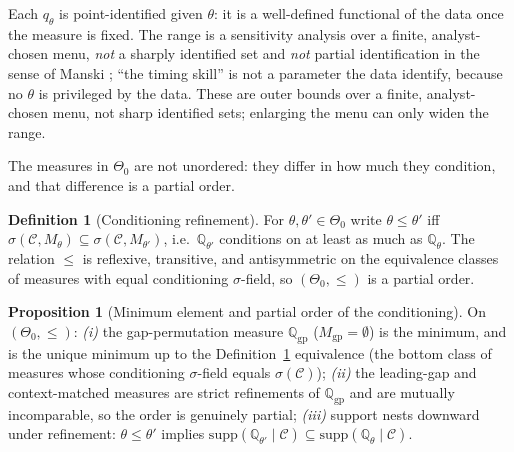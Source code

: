 \documentclass[preprint,12pt]{elsarticle}
\theoremstyle{definition}
\newtheorem{proposition}[theorem]{Proposition}
\newtheorem{definition}{Definition}
\begin{document}
Each $q_\theta$ is point-identified given $\theta$: it is a well-defined
functional of the data once the measure is fixed. The range is a sensitivity
analysis over a finite, analyst-chosen menu, \emph{not} a sharply identified set
and \emph{not} partial identification in the sense of Manski \cite{Manski2003}; ``the timing skill''
is not a parameter the data identify, because no $\theta$ is privileged by the
data. These are outer bounds over a finite, analyst-chosen menu, not sharp
identified sets; enlarging the menu can only widen the range.

The measures in $\Theta_0$ are not unordered: they differ in how much they
condition, and that difference is a partial order.

\begin{definition}[Conditioning refinement]
\label{def:refinement}
For $\theta,\theta'\in\Theta_0$ write $\theta\le\theta'$ iff
$\sigma(\mathcal C,M_\theta)\subseteq\sigma(\mathcal C,M_{\theta'})$, i.e.\
$\mathbb{Q}_{\theta'}$ conditions on at least as much as $\mathbb{Q}_\theta$. The
relation $\le$ is reflexive, transitive, and antisymmetric on the equivalence
classes of measures with equal conditioning $\sigma$-field, so $(\Theta_0,\le)$
is a partial order.
\end{definition}

\begin{proposition}[Minimum element and partial order of the conditioning]
\label{prop:lattice}
On $(\Theta_0,\le)$:
\emph{(i)} the gap-permutation measure $\mathbb{Q}_{\mathrm{gp}}$
($M_{\mathrm{gp}}=\emptyset$) is the minimum, and is the unique minimum up to the
Definition~\ref{def:refinement} equivalence (the bottom class of measures whose
conditioning $\sigma$-field equals $\sigma(\mathcal C)$);
\emph{(ii)} the leading-gap and context-matched measures are strict refinements of
$\mathbb{Q}_{\mathrm{gp}}$ and are mutually incomparable, so the order is genuinely
partial;
\emph{(iii)} support nests downward under refinement: $\theta\le\theta'$ implies
$\mathrm{supp}(\mathbb{Q}_{\theta'}\mid\mathcal C)\subseteq
\mathrm{supp}(\mathbb{Q}_{\theta}\mid\mathcal C)$.
\end{proposition}
\end{document}
